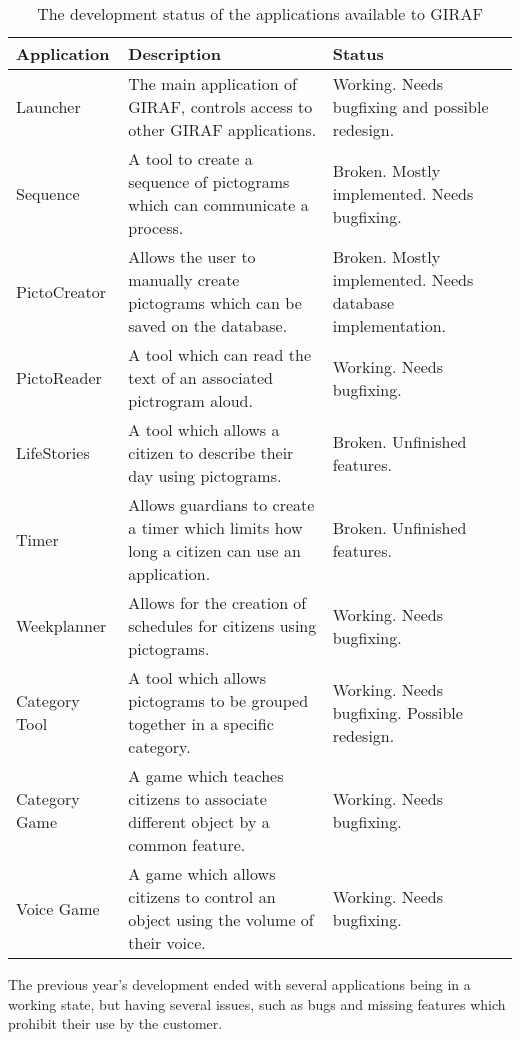 \begin{table}[H]
\centering
\begin{tabular}{|p{2.7cm}|p{6cm}|p{5cm}|}
\hline
Application			& Description & Status \\\hline
Launcher  			& The main application of GIRAF, controls access to other GIRAF
applications. & Working. Needs bugfixing and possible redesign. \\\hline
Sequence & A tool to create a sequence of pictograms which can communicate a
process. & Broken. Mostly implemented. Needs bugfixing.\\\hline 
PictoCreator  	   	& Allows the user to
manually create pictograms which can be saved on the database. & Broken. Mostly
implemented. Needs database implementation.\\\hline 
PictoReader	   		& A tool
which can read the text of an associated pictrogram aloud. & Working.
Needs bugfixing.\\\hline 
LifeStories	   		& A tool which allows a citizen to
describe their day using pictograms. & Broken. Unfinished features. \\\hline 
Timer     	   		& Allows guardians to create a timer which
limits how long a citizen can use an application. & Broken. Unfinished
features.\\\hline 
Weekplanner 		& Allows for the creation of schedules for citizens
using pictograms. & Working. Needs bugfixing.\\\hline 
Category Tool		& A tool which allows pictograms to be grouped together
in a specific category. & Working. Needs bugfixing. Possible redesign.\\\hline 
Category Game   	& A game which teaches citizens to associate
different object by a common feature. & Working. Needs bugfixing.\\\hline 
Voice Game  		& A game which allows citizens to control an object
using the volume of their voice. & Working. Needs bugfixing.\\\hline
\end{tabular} 
\caption{The development status of the applications available to GIRAF}
\label{GApps}
\end{table}

The previous year's development ended with several applications being in a
working state, but having several issues, such as bugs and missing features
which prohibit their use by the customer.

